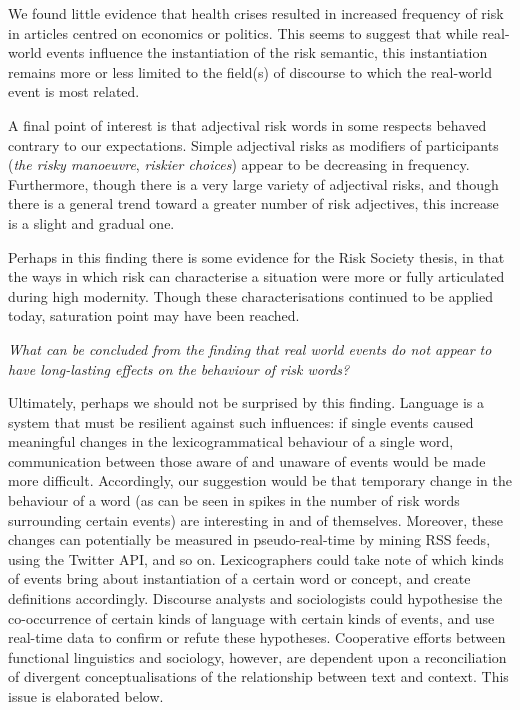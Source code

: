 	
	We found little evidence that health crises resulted in increased frequency of risk in articles centred on economics or politics. This seems to suggest that while real-world events influence the instantiation of the risk semantic, this instantiation remains more or less limited to the field(s) of discourse to which the real-world event is most related.

	A final point of interest is that adjectival risk words in some respects behaved contrary to our expectations. Simple adjectival risks as modifiers of participants (\emph{the risky manoeuvre}, \emph{riskier choices}) appear to be decreasing in frequency. Furthermore, though there is a very large variety of adjectival risks, and though there is a general trend toward a greater number of risk adjectives, this increase is a slight and gradual one.

	Perhaps in this finding there is some evidence for the Risk Society thesis, in that the ways in which risk can characterise a situation were more or fully articulated during high modernity. Though these characterisations continued to be applied today, saturation point may have been reached.

    \emph{What can be concluded from the finding that real world events do not appear to have long-lasting effects on the behaviour of risk words?}

        Ultimately, perhaps we should not be surprised by this finding. Language is a system that must be resilient against such influences: if single events caused meaningful changes in the lexicogrammatical behaviour of a single word, communication between those aware of and unaware of events would be made more difficult. Accordingly, our suggestion would be that temporary change in the behaviour of a word (as can be seen in spikes in the number of risk words surrounding certain events) are interesting in and of themselves. Moreover, these changes can potentially be measured in pseudo-real-time by mining RSS feeds, using the Twitter API, and so on. Lexicographers could take note of which kinds of events bring about instantiation of a certain word or concept, and create definitions accordingly. Discourse analysts and sociologists could hypothesise the co-occurrence of certain kinds of language with certain kinds of events, and use real-time data to confirm or refute these hypotheses. Cooperative efforts between functional linguistics and sociology, however, are dependent upon a reconciliation of divergent conceptualisations of the relationship between text and context. This issue is elaborated below.

